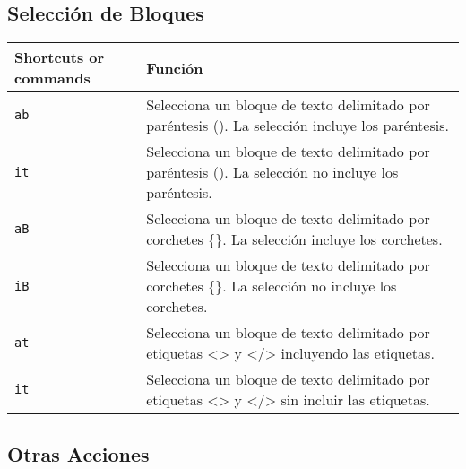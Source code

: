 \documentclass[
  doc,
  floatsintext,
  longtable,
  a4paper,
  nolmodern,
  notxfonts,
  notimes,
  colorlinks=true,linkcolor=blue,citecolor=blue,urlcolor=blue]{apa7}
\begin{document}
\subsection{Selección de Bloques}\label{selecciuxf3n-de-bloques}

\begin{longtable}[]{@{}
  >{\raggedright\arraybackslash}p{}
  >{\raggedright\arraybackslash}p{}@{}}
\toprule\noalign{}
\begin{minipage}[b]{\linewidth}\raggedright
Shortcuts or commands
\end{minipage} & \begin{minipage}[b]{\linewidth}\raggedright
Función
\end{minipage} \\
\midrule\noalign{}
\endhead
\bottomrule\noalign{}
\endlastfoot
\texttt{ab} & Selecciona un bloque de texto delimitado por paréntesis
(). La selección incluye los paréntesis. \\
\texttt{it} & Selecciona un bloque de texto delimitado por paréntesis
(). La selección no incluye los paréntesis. \\
\texttt{aB} & Selecciona un bloque de texto delimitado por corchetes
\{\}. La selección incluye los corchetes. \\
\texttt{iB} & Selecciona un bloque de texto delimitado por corchetes
\{\}. La selección no incluye los corchetes. \\
\texttt{at} & Selecciona un bloque de texto delimitado por etiquetas
\textless\textgreater{} y \textless/\textgreater{} incluyendo las
etiquetas. \\
\texttt{it} & Selecciona un bloque de texto delimitado por etiquetas
\textless\textgreater{} y \textless/\textgreater{} sin incluir las
etiquetas. \\
\end{longtable}

\subsection{Otras Acciones}\label{otras-acciones}
\end{document}
